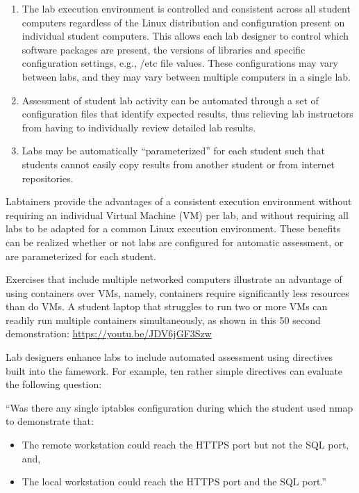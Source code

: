 \documentclass[12pt]{article}
\begin{document}
\begin{enumerate}
\item The lab execution environment is controlled and consistent
across all student computers regardless of the Linux distribution
and configuration present on individual student computers.  
This allows each lab designer to control
which software packages are present, the versions of libraries and
specific configuration settings, e.g., /etc file values. These configurations
may vary between labs, and they may vary between multiple computers in
a single lab.

\item Assessment of student lab activity can be automated through a
set of configuration files that identify expected results, thus
relieving lab instructors from having to individually review detailed lab
results.

\item Labs may be automatically ``parameterized'' for each student such that
students cannot easily copy results from another student or from internet
repositories.  
\end{enumerate}

Labtainers provide the advantages of a consistent
execution environment without requiring
an individual Virtual Machine (VM) per lab, and without requiring all labs to be adapted for
a common Linux execution environment.   These benefits can be realized 
whether or not labs are configured for automatic assessment, 
or are parameterized for each student.

Exercises that include multiple networked computers illustrate an advantage 
of using containers over VMs, namely, containers require significantly less resources
than do VMs.  A student laptop that struggles to run two or more VMs can readily 
run multiple containers simultaneously, as shown in this 50 second demonstration: \url{https://youtu.be/JDV6jGF3Szw} 

Lab designers enhance labs to include automated assessment using directives built into the famework.
For example, ten rather simple directives can evaluate the following question:

``Was there any
single iptables configuration during which the student used nmap to demonstrate that:
\begin{itemize}
\item The remote workstation could reach the HTTPS port but not the SQL port, and,
\item The local workstation could reach the HTTPS port and the SQL port.''
\end{itemize}
\end{document}

